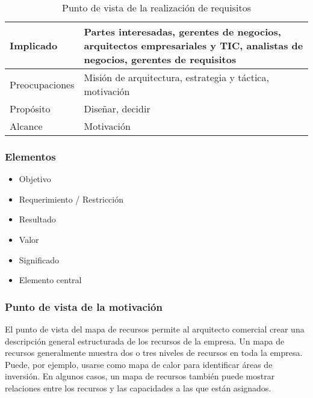 \begin{table}[ht]
	\begin{center}
		
		\begin{tabular}{ | m{6em} | m{8cm}|  } 
			\hline
			Implicado & Partes interesadas, gerentes de negocios, arquitectos empresariales y TIC, analistas de negocios, gerentes de requisitos 
			\\
			\hline
			Preocupaciones & Misión de arquitectura, estrategia y táctica, motivación
			\\
			\hline
			Propósito & Diseñar, decidir
			\\
			\hline
			Alcance & Motivación
			\\
			\hline
			
		\end{tabular}
		\caption{Punto de vista de la realización de requisitos}
		\label{tab:concepts}
	\end{center}
\end{table}

\subsubsection{Elementos}
\begin{itemize}
	\item Objetivo
	\item Requerimiento / Restricción
	\item Resultado
	\item Valor
	\item Significado
	\item Elemento central
\end{itemize}

\subsubsection{Punto de vista de la motivación} 


El punto de vista del mapa de recursos permite al arquitecto comercial crear una descripción general estructurada de los recursos de la empresa. Un mapa de recursos generalmente muestra dos o tres niveles de recursos en toda la empresa. Puede, por ejemplo, usarse como mapa de calor para identificar áreas de inversión. En algunos casos, un mapa de recursos también puede mostrar relaciones entre los recursos y las capacidades a las que están asignados.

